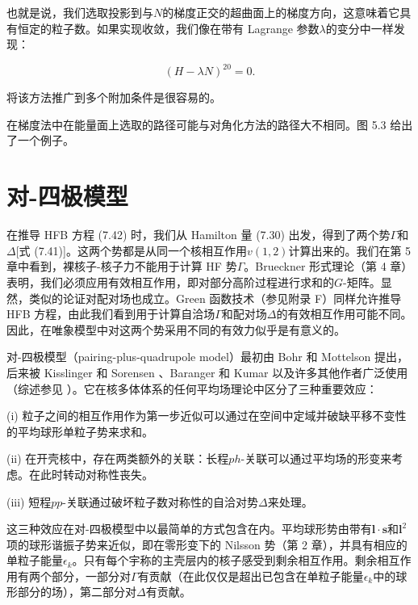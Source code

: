 也就是说，我们选取投影到与$N$的梯度正交的超曲面上的梯度方向，这意味着它具有恒定的粒子数。如果实现收敛，我们像在带有 Lagrange
参数$\lambda$的变分中一样发现：

\begin{equation}
(H-\lambda N)^{20}=0.\label{eq:h_lambda_n_20_zero}
\end{equation}

将该方法推广到多个附加条件是很容易的。

在梯度法中在能量面上选取的路径可能与对角化方法的路径大不相同。图 5.3 给出了一个例子。

\section{对-四极模型\label{sec:=00914D=005BF9=0052A0=0056DB=006781=006A21=00578B}}

在推导 HFB 方程 (7.42) 时，我们从 Hamilton 量 (7.30) 出发，得到了两个势$\Gamma$和$\Delta${[}式
(7.41){]}。这两个势都是从同一个核相互作用$v(1,2)$计算出来的。我们在第 5 章中看到，裸核子-核子力不能用于计算
HF 势$\Gamma$。Brueckner 形式理论（第 4 章）表明，我们必须应用有效相互作用，即对部分高阶过程进行求和的$G$-矩阵。显然，类似的论证对配对场也成立。Green
函数技术（参见附录 F）同样允许推导 HFB 方程\cite{Go58,AGD63,Mi67}，由此我们看到用于计算自洽场$\Gamma$和配对场$\Delta$的有效相互作用可能不同。因此，在唯象模型中对这两个势采用不同的有效力似乎是有意义的。

对-四极模型（pairing-plus-quadrupole model）最初由 Bohr 和 Mottelson 提出，后来被 Kisslinger
和 Sorensen \cite{KS60}、Baranger 和 Kumar \cite{BK65,BK68} 以及许多其他作者广泛使用（综述参见
\cite{BS69}）。它在核多体体系的任何平均场理论中区分了三种重要效应：

(i) 粒子之间的相互作用作为第一步近似可以通过在空间中定域并破缺平移不变性的平均球形单粒子势来求和。

(ii) 在开壳核中，存在两类额外的关联：长程$ph$-关联可以通过平均场的形变来考虑。在此时转动对称性丧失。

(iii) 短程$pp$-关联通过破坏粒子数对称性的自洽对势$\Delta$来处理。

这三种效应在对-四极模型中以最简单的方式包含在内。平均球形势由带有$\boldsymbol{l}\cdot\boldsymbol{s}$和$\boldsymbol{l}^{2}$项的球形谐振子势来近似，即在零形变下的
Nilsson 势（第 2 章），并具有相应的单粒子能量$\epsilon_{k}$。只有每个宇称的主壳层内的核子感受到剩余相互作用。剩余相互作用有两个部分，一部分对$\Gamma$有贡献（在此仅仅是超出已包含在单粒子能量$\epsilon_{k}$中的球形部分的场），第二部分对$\Delta$有贡献。

